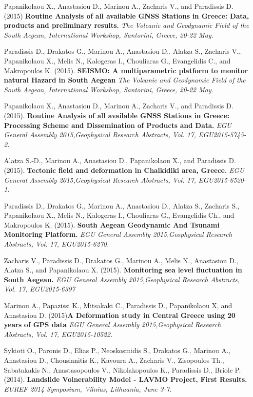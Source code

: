 \documentclass[a4paper]{Classes/cv_prof_en} %
\begin{document}
\begin{etaremune}
\item Papanikolaou X., Anastasiou D., Marinou A., Zacharis V., and Paradissis D. (2015) \textbf{Routine Analysis of all available GNSS Stations in Greece: Data, products and preliminary results.} \textit{The Volcanic and Geodynamic Field of the South Aegean, International Workshop, Santorini, Greece, 20-22 May.}
\item Paradissis D., Drakatos G., Marinou A., Anastasiou D., Alatza S., Zacharis V., Papanikolaou X., Melis N., Kalogeras I., Chouliaras G., Evangelidis C., and Makropoulos K. (2015). \textbf{SEISMO: A multiparametric platform to monitor natural Hazard in South Aegean}  \textit{The Volcanic and Geodynamic Field of the South Aegean, International Workshop, Santorini, Greece, 20-22 May.}
\item Papanikolaou X., Anastasiou D., Marinou A., Zacharis V., and Paradissis D. (2015). \textbf{Routine Analysis of all available GNSS Stations in Greece: Processing Scheme and Dissemination of Products and Data.} \textit{EGU General Assembly 2015,Geophysical Research Abstracts, Vol. 17, EGU2015-5745-2.}
\item Alatza S.-D., Marinou A., Anastasiou D., Papanikolaou X., and Paradissis D. (2015). \textbf{Tectonic field and deformation in Chalkidiki area, Greece.}  \textit{EGU General Assembly 2015,Geophysical Research Abstracts, Vol. 17, EGU2015-6520-1.}
\item Paradissis D., Drakatos G., Marinou A., Anastasiou D., Alatza S., Zacharis S., Papanikolaou X., Melis N., Kalogeras I., Chouliaras G., Evangelidis Ch., and Makropoulos K. (2015). \textbf{South Aegean Geodynamic And Tsunami Monitoring Platform.} \textit{EGU General Assembly 2015,Geophysical Research Abstracts, Vol. 17, EGU2015-6270.}
\item Zacharis V., Paradissis D., Drakatos G., Marinou A., Melis N., Anastasiou D., Alatza S., and Papanikolaou X. (2015). \textbf{Monitoring sea level fluctuation in South Aegean.} \textit{EGU General Assembly 2015,Geophysical Research Abstracts, Vol. 17, EGU2015-6397}
\item Marinou A., Papazissi K., Mitsakaki C., Paradissis D., Papanikolaou X, and Anastasiou D. (2015)\textbf{Α Deformation study in Central Greece using 20 years of GPS data} \textit{EGU General Assembly 2015,Geophysical Research Abstracts, Vol. 17, EGU2015-10522.}
\item Sykioti O., Paronis D., Elias P., Neoskosmidis S., Drakatos G., Marinou A., Anastasiou D., Chousianitis K., Kavoura A., Zacharis V., Zisopoulos Th., Sabatakakis N., Anastasopoulos V., Nikolakopoulos K., Paradissis D., Briole P. (2014). \textbf{Landslide Volnerability Model - LAVMO Project, First Results.} \textit{EUREF 2014 Symposium, Vilnius, Lithuania, June 3-7.}

\end{etaremune}
\end{document}
